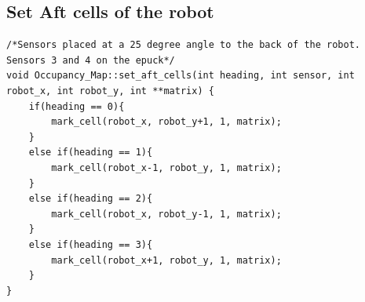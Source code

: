 \subsection{Set Aft cells of the robot}
\label{code:set_aft}

\begin{lstlisting}[caption = {Code to set cells to the aft of the robot}]
/*Sensors placed at a 25 degree angle to the back of the robot. Sensors 3 and 4 on the epuck*/
void Occupancy_Map::set_aft_cells(int heading, int sensor, int robot_x, int robot_y, int **matrix) {
    if(heading == 0){
        mark_cell(robot_x, robot_y+1, 1, matrix);
    }
    else if(heading == 1){
        mark_cell(robot_x-1, robot_y, 1, matrix);
    }
    else if(heading == 2){
        mark_cell(robot_x, robot_y-1, 1, matrix);
    }
    else if(heading == 3){
        mark_cell(robot_x+1, robot_y, 1, matrix);
    }
}
\end{lstlisting}